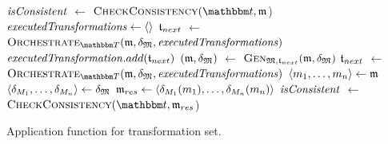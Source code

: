 \begin{algorithm}
    \begin{algorithmic}[1]
            \State $\mathit{isConsistent}$ $\leftarrow$ $\function{CheckConsistency}(\transformationset{t}, \modeltuple{m}$)
                \State \Return{$\bot$}
            \EndIf
            \State $\mathit{executedTransformations} \leftarrow \langle  \rangle$
            \State $\mathfrak{t}_{next}$ $\leftarrow$ $\function{Orchestrate}_{\transformationset{T}}(\modeltuple{m}, \changetuple{\metamodeltuple{M}}, \mathvariable{executedTransformations})$ \label{algo:orchestration:application:line:startorchestrate}
                \State $\mathit{executedTransformation}.add(\mathfrak{t}_{next})$
                \State $(\mathfrak{m}, \mathfrak{\delta}_{\mathfrak{M}})$ $\leftarrow$ $\textsc{Gen}_{\mathfrak{M}, \mathfrak{t}_{next}}(\mathfrak{m}, \mathfrak{\delta}_{\mathfrak{M}})$
                \State $\mathfrak{t}_{next}$ $\leftarrow$ $\function{Orchestrate}_{\transformationset{T}}(\modeltuple{m}, \changetuple{\metamodeltuple{M}}, \mathvariable{executedTransformations})$
            \EndWhile \label{algo:orchestration:application:line:endorchestrate}
            \State $\langle m_{1}, \dots, m_{n} \rangle \leftarrow \mathfrak{m}$
            \State $\langle \delta_{M_{1}}, \dots, \delta_{M_{n}} \rangle \leftarrow \mathfrak{\delta}_{\mathfrak{M}}$
            \State $\mathfrak{m}_{res} \leftarrow \langle \delta_{M_{1}}(m_{1}), \dots, \delta_{M_{n}}(m_{n}) \rangle$
            \State $\mathit{isConsistent}$ $\leftarrow$ $\function{CheckConsistency}(\transformationset{t}, \modeltuple{m}_{res}$) \label{algo:orchestration:application:line:consistencycheck}
                \State \Return{$\bot$}
            \EndIf
            \State {} \label{algo:orchestration:application:line:returnresult}
        \EndProcedure
    \end{algorithmic}
    \caption[Application function for transformations]{Application function for transformation set.}
    \label{algo:orchestration:application}
\end{algorithm}

